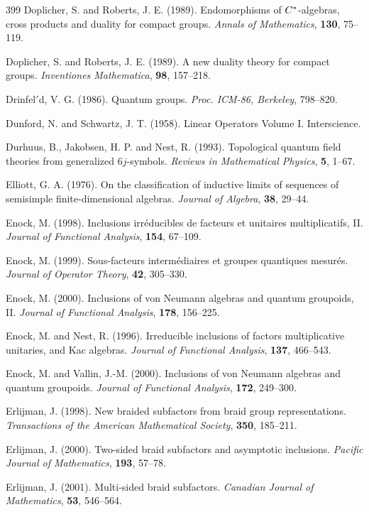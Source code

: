 \documentclass[12pt]{article}
\theoremstyle{plain}
\theoremstyle{definition}
\numberwithin{equation}{section}
\begin{document}
\begin{thebibliography} {399}
Doplicher, S. and Roberts, J. E. (1989).
Endomorphisms of $C\sp *$-algebras, cross products
and duality for compact groups. 
{\em Annals of Mathematics}, {\bf 130}, 75--119.

Doplicher, S. and Roberts, J. E. (1989).
A new duality theory for compact groups.
{\em Inventiones Mathematica}, {\bf 98}, 157--218.

Drinfel$'$d, V. G. (1986).  Quantum groups.
{\em Proc. ICM-86, Berkeley}, 798--820.

Dunford, N. and Schwartz, J. T. (1958).
Linear Operators Volume I. Interscience.

Durhuus, B., Jakobsen, H. P. and Nest, R. (1993).
Topological quantum field theories from generalized $6j$-symbols. 
{\em Reviews in Mathematical Physics}, {\bf 5}, 1--67.

Elliott, G. A. (1976).
On the classification of inductive limits of 
sequences of semisimple finite-dimensional algebras.
{\em Journal of Algebra}, {\bf 38}, 29--44.

Enock, M. (1998).
Inclusions irr\'educibles de facteurs et unitaires multiplicatifs, II.
{\em Journal of Functional Analysis}, {\bf 154}, 67--109.

Enock, M. (1999).
Sous-facteurs interm\'ediaires et groupes quantiques mesur\'es.
{\em Journal of Operator Theory}, {\bf 42}, 305--330.

Enock, M. (2000).
Inclusions of von Neumann algebras and quantum groupoids, II.
{\em Journal of Functional Analysis}, {\bf 178}, 156--225.

Enock, M. and Nest, R. (1996).
Irreducible inclusions of factors  multiplicative unitaries,
and Kac algebras.
{\em Journal of Functional Analysis}, {\bf 137}, 466--543.

Enock, M. and Vallin, J.-M. (2000).
Inclusions of von Neumann algebras and quantum groupoids.
{\em Journal of Functional Analysis}, {\bf 172}, 249--300.

Erlijman, J. (1998).
New braided subfactors from braid group representations.
{\em Transactions of the American Mathematical Society}, 
{\bf 350}, 185--211.

Erlijman, J. (2000).
Two-sided braid subfactors and asymptotic inclusions.
{\em Pacific Journal of Mathematics}, {\bf 193}, 57--78.

Erlijman, J. (2001).
Multi-sided braid subfactors.
{\em Canadian Journal of Mathematics}, {\bf 53}, 546--564.


\end{thebibliography}
\end{document}
